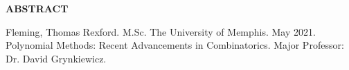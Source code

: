 \newpage
\begin{center}
	\textbf{ABSTRACT}
\end{center}
\vspace{-0.15in}
\thispagestyle{plain}
\begin{singlespace}

	Fleming, Thomas Rexford. M.Sc. The University of Memphis. May 2021. Polynomial Methods: Recent Advancements in Combinatorics. Major Professor: Dr. David Grynkiewicz.
\end{singlespace}

\blindtext
